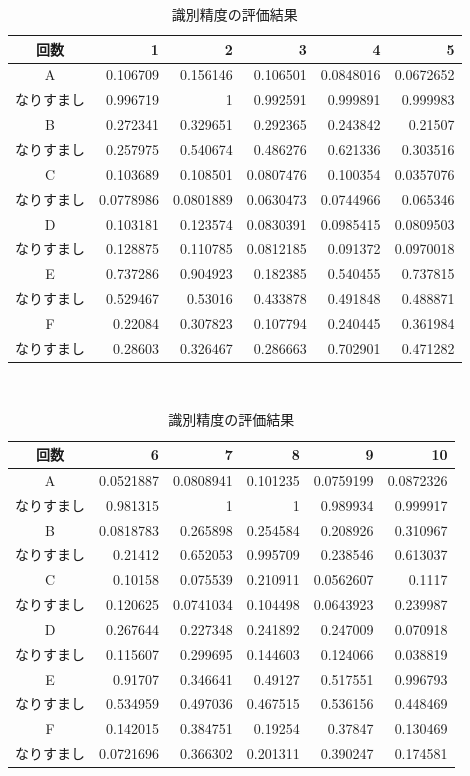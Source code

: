 \begin{table}[hbtp]
  \centering
  \caption{識別精度の評価結果}
  \label{auth-result}
  \begin{tabular}{|c|r|r|r|r|r|} \hline
    回数 & 1 & 2 & 3 & 4 & 5 \\ \hline
    A & 0.106709 & 0.156146 & 0.106501 & 0.0848016 & 0.0672652 \\
    なりすまし & 0.996719 & 1 & 0.992591 & 0.999891 & 0.999983 \\ \hline
    B & 0.272341 & 0.329651 & 0.292365 & 0.243842 & 0.21507 \\
    なりすまし & 0.257975 & 0.540674 & 0.486276 & 0.621336 & 0.303516 \\ \hline
    C & 0.103689 & 0.108501 & 0.0807476 & 0.100354 & 0.0357076 \\
    なりすまし & 0.0778986 & 0.0801889 & 0.0630473 & 0.0744966 & 0.065346 \\ \hline
    D & 0.103181 & 0.123574 & 0.0830391 & 0.0985415 & 0.0809503 \\
    なりすまし & 0.128875 & 0.110785 & 0.0812185 & 0.091372 & 0.0970018 \\ \hline
    E & 0.737286 & 0.904923 & 0.182385 & 0.540455 & 0.737815 \\
    なりすまし & 0.529467 & 0.53016 & 0.433878 & 0.491848 & 0.488871 \\ \hline
    F & 0.22084 & 0.307823 & 0.107794 & 0.240445 & 0.361984 \\
    なりすまし & 0.28603 & 0.326467 & 0.286663 & 0.702901 & 0.471282 \\ \hline
  \end{tabular}
\\
  \begin{tabular}{|c|r|r|r|r|r|} \hline
    回数 & 6 & 7 & 8 & 9 & 10 \\ \hline
    A & 0.0521887 & 0.0808941 & 0.101235 & 0.0759199 & 0.0872326 \\
    なりすまし & 0.981315 & 1 & 1 & 0.989934 & 0.999917 \\ \hline
    B & 0.0818783 & 0.265898 & 0.254584 & 0.208926 & 0.310967 \\
    なりすまし & 0.21412 & 0.652053 & 0.995709 & 0.238546 & 0.613037 \\ \hline
    C & 0.10158 & 0.075539 & 0.210911 & 0.0562607 & 0.1117 \\
    なりすまし & 0.120625 & 0.0741034 & 0.104498 & 0.0643923 & 0.239987 \\ \hline
    D & 0.267644 & 0.227348 & 0.241892 & 0.247009 & 0.070918 \\
    なりすまし & 0.115607 & 0.299695 & 0.144603 & 0.124066 & 0.038819 \\ \hline
    E & 0.91707 & 0.346641 & 0.49127 & 0.517551 & 0.996793 \\
    なりすまし & 0.534959 & 0.497036 & 0.467515 & 0.536156  & 0.448469 \\ \hline
    F & 0.142015 & 0.384751 & 0.19254 & 0.37847 & 0.130469 \\
    なりすまし & 0.0721696 & 0.366302 & 0.201311 & 0.390247 & 0.174581 \\ \hline
  \end{tabular}
\end{table}


